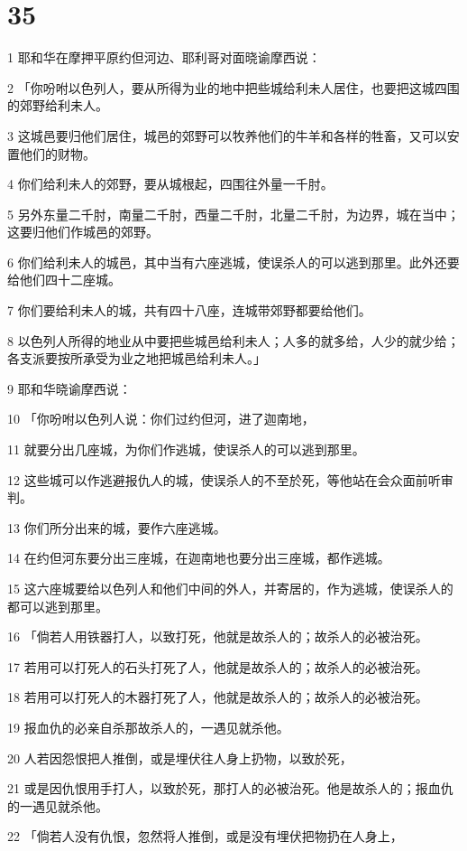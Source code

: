 \chapter{35}

\par 1 耶和华在摩押平原约但河边、耶利哥对面晓谕摩西说：
\par 2 「你吩咐以色列人，要从所得为业的地中把些城给利未人居住，也要把这城四围的郊野给利未人。
\par 3 这城邑要归他们居住，城邑的郊野可以牧养他们的牛羊和各样的牲畜，又可以安置他们的财物。
\par 4 你们给利未人的郊野，要从城根起，四围往外量一千肘。
\par 5 另外东量二千肘，南量二千肘，西量二千肘，北量二千肘，为边界，城在当中；这要归他们作城邑的郊野。
\par 6 你们给利未人的城邑，其中当有六座逃城，使误杀人的可以逃到那里。此外还要给他们四十二座城。
\par 7 你们要给利未人的城，共有四十八座，连城带郊野都要给他们。
\par 8 以色列人所得的地业从中要把些城邑给利未人；人多的就多给，人少的就少给；各支派要按所承受为业之地把城邑给利未人。」
\par 9 耶和华晓谕摩西说：
\par 10 「你吩咐以色列人说：你们过约但河，进了迦南地，
\par 11 就要分出几座城，为你们作逃城，使误杀人的可以逃到那里。
\par 12 这些城可以作逃避报仇人的城，使误杀人的不至於死，等他站在会众面前听审判。
\par 13 你们所分出来的城，要作六座逃城。
\par 14 在约但河东要分出三座城，在迦南地也要分出三座城，都作逃城。
\par 15 这六座城要给以色列人和他们中间的外人，并寄居的，作为逃城，使误杀人的都可以逃到那里。
\par 16 「倘若人用铁器打人，以致打死，他就是故杀人的；故杀人的必被治死。
\par 17 若用可以打死人的石头打死了人，他就是故杀人的；故杀人的必被治死。
\par 18 若用可以打死人的木器打死了人，他就是故杀人的；故杀人的必被治死。
\par 19 报血仇的必亲自杀那故杀人的，一遇见就杀他。
\par 20 人若因怨恨把人推倒，或是埋伏往人身上扔物，以致於死，
\par 21 或是因仇恨用手打人，以致於死，那打人的必被治死。他是故杀人的；报血仇的一遇见就杀他。
\par 22 「倘若人没有仇恨，忽然将人推倒，或是没有埋伏把物扔在人身上，
